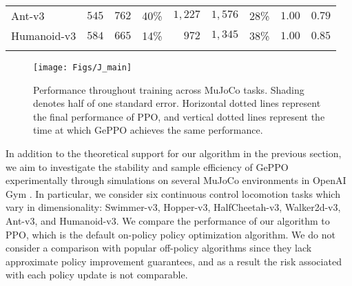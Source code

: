 \documentclass{article}
\begin{document}
\begin{table}
\begin{tabular}{l R{0.075} R{0.075} R{0.05} R{0.075} R{0.075} R{0.05} R{0.075} R{0.075} }
    Ant-v3         & $545$ \hspace{1em}     & $762$ \hspace{1em}     & 40\% & $1{,}227$ \hspace{1em} & $1{,}576$ \hspace{1em} & 28\% & $1.00$ \hspace{1em} & $0.79$ \hspace{1em} \\
    Humanoid-v3    & $584$ \hspace{1em}    & $665$ \hspace{1em}    & 14\% & $972$ \hspace{1em}    & $1{,}345$ \hspace{1em} & 38\% & $1.00$ \hspace{1em} & $0.85$ \hspace{1em} \\            
	\addlinespace
    \cmidrule(lr){1-3}
     \\
    \bottomrule
  \end{tabular}
\end{table}

\begin{figure}
\centering
\texttt{[image: Figs/J\_main]}
\caption{Performance throughout training across MuJoCo tasks. Shading denotes half of one standard error. Horizontal dotted lines represent the final performance of PPO, and vertical dotted lines represent the time at which GePPO achieves the same performance.}\label{fig:Jplot}
\end{figure}

In addition to the theoretical support for our algorithm in the previous section, we aim to investigate the stability and sample efficiency of GePPO experimentally through simulations on several MuJoCo environments \citep{todorov_2012} in OpenAI Gym \citep{brockman_2016}. In particular, we consider six continuous control locomotion tasks which vary in dimensionality: Swimmer-v3, Hopper-v3, HalfCheetah-v3, Walker2d-v3, Ant-v3, and Humanoid-v3. We compare the performance of our algorithm to PPO, which is the default on-policy policy optimization algorithm. We do not consider a comparison with popular off-policy algorithms since they lack approximate policy improvement guarantees, and as a result the risk associated with each policy update is not comparable.
\end{document}
